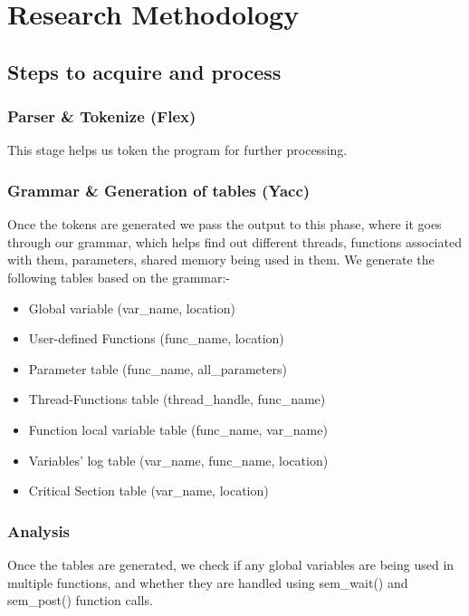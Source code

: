 \chapter{Research Methodology}


\section{Steps to acquire and process}
\subsection{Parser & Tokenize (Flex)}
This stage helps us token the program for further processing.

\subsection{Grammar & Generation of tables (Yacc)}
Once the tokens are generated we pass the output to this phase, where it goes
through our grammar, which helps find out different threads, functions associated
with them, parameters, shared memory being used in them.
We generate the following tables based on the grammar:-
\begin{itemize}
\item Global variable (var\_name, location)
\item User-defined Functions (func\_name, location)
\item Parameter table (func\_name, all\_parameters)
\item Thread-Functions table (thread\_handle, func\_name)
\item Function local variable table (func\_name, var\_name)
\item Variables' log table (var\_name, func\_name, location)
\item Critical Section table (var\_name, location)
\end{itemize}
\subsection{Analysis}
Once the tables are generated, we check if any global variables are being used
in multiple functions, and whether they are handled using sem\_wait() and sem\_post()
function calls.

